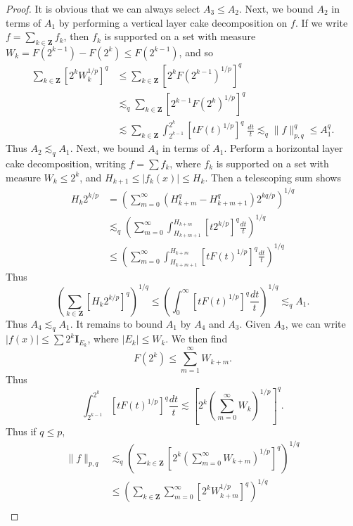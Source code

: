 \begin{proof}
    It is obvious that we can always select $A_3 \leq A_2$. Next, we bound $A_2$ in terms of $A_1$ by performing a vertical layer cake decomposition on $f$. If we write $f = \sum_{k \in \mathbf{Z}} f_k$, then $f_k$ is supported on a set with measure $W_k = F(2^{k-1}) - F(2^k) \leq F(2^{k-1})$, and so
    \begin{align*}
        \sum_{k \in \mathbf{Z}} [2^k W_k^{1/p}]^q &\leq \sum_{k \in \mathbf{Z}} [2^k F(2^{k-1})^{1/p}]^q\\
        &\lesssim_q \sum_{k \in \mathbf{Z}} [2^{k-1} F(2^k)^{1/p}]^q\\
        &\lesssim \sum_{k \in \mathbf{Z}} \int_{2^{k-1}}^{2^k} [tF(t)^{1/p}]^q\; \frac{dt}{t} \lesssim_q \| f \|_{p,q}^q \leq A_1^q.
    \end{align*}
    Thus $A_2 \lesssim_q A_1$. Next, we bound $A_4$ in terms of $A_1$. Perform a horizontal layer cake decomposition, writing $f = \sum f_k$, where $f_k$ is supported on a set with measure $W_k \leq 2^k$, and $H_{k+1} \leq |f_k(x)| \leq H_k$. Then a telescoping sum shows
    \begin{align*}
        H_k 2^{k/p} &= \left( \sum_{m = 0}^\infty (H_{k+m}^q - H_{k+m+1}^q) 2^{kq /p} \right)^{1/q}\\
        &\lesssim_q \left( \sum_{m = 0}^\infty \int_{H_{k+m+1}}^{H_{k+m}} [t 2^{k/p}]^q \frac{dt}{t} \right)^{1/q}\\
        &\leq \left( \sum_{m = 0}^\infty \int_{H_{k+m+1}}^{H_{k+m}} [t F(t)^{1/p}]^q \frac{dt}{t} \right)^{1/q}
    \end{align*}
    Thus
    \[ \left( \sum_{k \in \mathbf{Z}} [H_k 2^{k/p}]^q \right)^{1/q} \leq \left( \int_0^\infty [t F(t)^{1/p}]^q \frac{dt}{t} \right)^{1/q} \lesssim_q A_1. \]
    Thus $A_4 \lesssim_q A_1$. It remains to bound $A_1$ by $A_4$ and $A_3$. Given $A_3$, we can write $|f(x)| \leq \sum 2^k \mathbf{I}_{E_k}$, where $|E_k| \leq W_k$. We then find
    \[ F(2^k) \leq \sum_{m = 1}^\infty W_{k+m}. \]
    Thus
    \[ \int_{2^{k-1}}^{2^k} [t F(t)^{1/p}]^q \frac{dt}{t} \lesssim \left[ 2^k \left(\sum_{m = 0}^\infty W_k \right)^{1/p} \right]^q. \]
    Thus if $q \leq p$,
    \begin{align*}
        \| f \|_{p,q} &\lesssim_q \left( \sum_{k \in \mathbf{Z}} \left[2^k \left( \sum_{m = 0}^\infty W_{k+m} \right)^{1/p} \right]^q \right)^{1/q}\\
        &\leq \left( \sum_{k \in \mathbf{Z}} \sum_{m = 0}^\infty \left[ 2^k W_{k+m}^{1/p} \right]^q \right)^{1/q}\\

\end{align*}
\end{proof}
